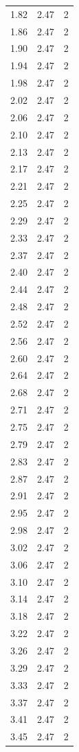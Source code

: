 \begin{longtable}{lrr}
  1.82 & 2.47 & 2 \\
  1.86 & 2.47 & 2 \\
  1.90 & 2.47 & 2 \\
  1.94 & 2.47 & 2 \\
  1.98 & 2.47 & 2 \\
  2.02 & 2.47 & 2 \\
  2.06 & 2.47 & 2 \\
  2.10 & 2.47 & 2 \\
  2.13 & 2.47 & 2 \\
  2.17 & 2.47 & 2 \\
  2.21 & 2.47 & 2 \\
  2.25 & 2.47 & 2 \\
  2.29 & 2.47 & 2 \\
  2.33 & 2.47 & 2 \\
  2.37 & 2.47 & 2 \\
  2.40 & 2.47 & 2 \\
  2.44 & 2.47 & 2 \\
  2.48 & 2.47 & 2 \\
  2.52 & 2.47 & 2 \\
  2.56 & 2.47 & 2 \\
  2.60 & 2.47 & 2 \\
  2.64 & 2.47 & 2 \\
  2.68 & 2.47 & 2 \\
  2.71 & 2.47 & 2 \\
  2.75 & 2.47 & 2 \\
  2.79 & 2.47 & 2 \\
  2.83 & 2.47 & 2 \\
  2.87 & 2.47 & 2 \\
  2.91 & 2.47 & 2 \\
  2.95 & 2.47 & 2 \\
  2.98 & 2.47 & 2 \\
  3.02 & 2.47 & 2 \\
  3.06 & 2.47 & 2 \\
  3.10 & 2.47 & 2 \\
  3.14 & 2.47 & 2 \\
  3.18 & 2.47 & 2 \\
  3.22 & 2.47 & 2 \\
  3.26 & 2.47 & 2 \\
  3.29 & 2.47 & 2 \\
  3.33 & 2.47 & 2 \\
  3.37 & 2.47 & 2 \\
  3.41 & 2.47 & 2 \\
  3.45 & 2.47 & 2 \\

\end{longtable}

